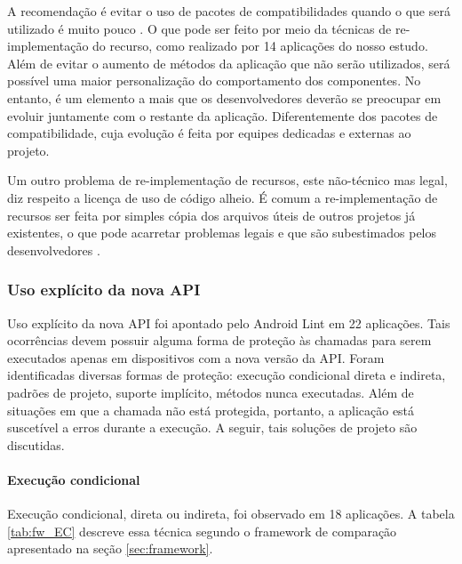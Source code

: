 A recomendação é evitar o uso de pacotes de compatibilidades quando o que será
utilizado é muito pouco \cite{Estouro}. O que pode ser feito por meio da técnicas
de re-implementação do recurso, como realizado por 14 aplicações do nosso estudo.
Além de evitar o aumento de métodos da aplicação que não serão utilizados, será
possível uma maior personalização do comportamento dos componentes. No entanto,
é um elemento a mais que os desenvolvedores deverão se preocupar em evoluir
juntamente com o restante da aplicação. Diferentemente dos pacotes de compatibilidade,
cuja evolução é feita por equipes dedicadas e externas ao projeto.

Um outro problema de re-implementação de recursos, este não-técnico mas legal,
diz respeito a licença de uso de código alheio. É comum a re-implementação de
recursos ser feita por simples cópia dos arquivos úteis de outros projetos já
existentes, o que pode acarretar problemas legais e que são subestimados pelos
desenvolvedores \cite{Minelli}.

\subsubsection{Uso explícito da nova API}
Uso explícito da nova API foi apontado pelo Android Lint em 22 aplicações. Tais
ocorrências devem possuir alguma forma de proteção às chamadas para serem executados
apenas em dispositivos com a nova versão da API.  Foram identificadas diversas formas
de proteção: execução condicional direta e indireta, padrões de projeto, suporte implícito,
métodos nunca executadas. Além de situações em que a chamada não está protegida, portanto,
a aplicação está suscetível a erros durante a execução.  A seguir, tais soluções de projeto
são discutidas.

\paragraph{Execução condicional}

Execução condicional, direta ou indireta, foi observado em 18 aplicações.
A tabela \ref{tab:fw_EC} descreve essa técnica segundo o framework de
comparação apresentado na seção \ref{sec:framework}.

